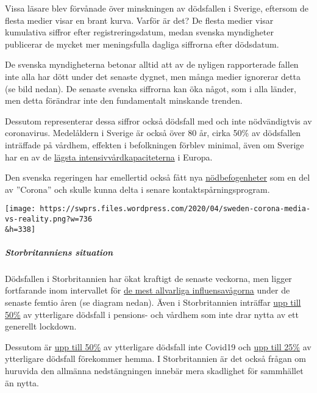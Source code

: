 Vissa läsare blev förvånade över minskningen av dödsfallen i Sverige,
eftersom de flesta medier visar en brant kurva. Varför är det? De flesta
medier visar kumulativa siffror efter registreringsdatum, medan svenska
myndigheter publicerar de mycket mer meningsfulla dagliga siffrorna
efter dödsdatum.

De svenska myndigheterna betonar alltid att av de nyligen rapporterade
fallen inte alla har dött under det senaste dygnet, men många medier
ignorerar detta (se bild nedan). De senaste svenska siffrorna kan öka
något, som i alla länder, men detta förändrar inte den fundamentalt
minskande trenden.

Dessutom representerar dessa siffror också dödsfall med och inte
nödvändigtvis av coronavirus. Medelåldern i Sverige är också över 80 år,
cirka 50\% av dödsfallen inträffade på vårdhem, effekten i befolkningen
förblev minimal, även om Sverige har en av de
\href{https://link.springer.com/article/10.1007/s00134-012-2627-8}{lägsta
intensivvårdkapaciteterna} i Europa.

Den svenska regeringen har emellertid också fått nya
\href{https://www.tagesschau.de/faktenfinder/ausland/corona-kursaenderung-schweden-103.html}{nödbefogenheter}
som en del av ''Corona'' och skulle kunna delta i senare
kontaktspårningsprogram.

\texttt{[image: https://swprs.files.wordpress.com/2020/04/sweden-corona-media-vs-reality.png?w=736\\\&h=338]}

\hypertarget{storbritanniens-situation}{%
\subparagraph{\texorpdfstring{\textbf{Storbritanniens
situation}}{Storbritanniens situation}}\label{storbritanniens-situation}}

Dödsfallen i Storbritannien har ökat kraftigt de senaste veckorna, men
ligger fortfarande inom intervallet för
\href{http://inproportion2.talkigy.com/}{de mest allvarliga
influensavågorna} under de senaste femtio åren (se diagram nedan). Även
i Storbritannien inträffar
\href{https://ltccovid.org/2020/04/12/mortality-associated-with-covid-19-outbreaks-in-care-homes-early-international-evidence/}{upp
till 50\%} av ytterligare dödsfall i pensions- och vårdhem som inte drar
nytta av ett generellt lockdown.

Dessutom är
\href{https://www.thetimes.co.uk/edition/news/coronavirus-record-weekly-death-toll-as-fearful-patients-avoid-hospitals-bm73s2tw3}{upp
till 50\%} av ytterligare dödsfall inte Covid19 och
\href{https://www.ft.com/content/67e6a4ee-3d05-43bc-ba03-e239799fa6ab}{upp
till 25\%} av ytterligare dödsfall förekommer hemma. I Storbritannien är
det också frågan om huruvida den allmänna nedstängningen innebär mera
skadlighet för sammhället än nytta.

